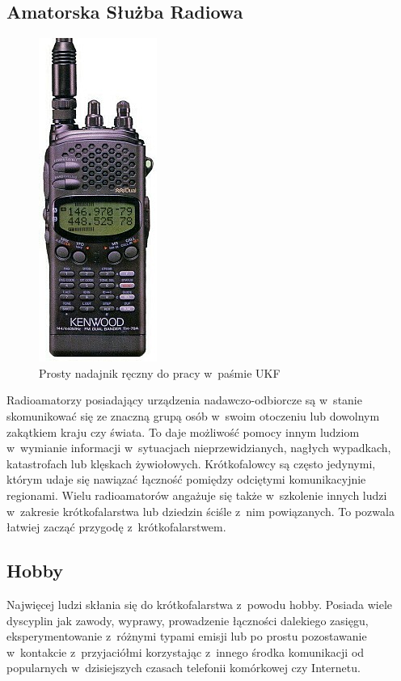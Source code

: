 \documentclass[eng,oneside]{mgr}
\begin{document}
			\subsection{Amatorska Służba Radiowa}
			\begin{figure}
				\vspace{-20pt}
				\begin{center}
					\includegraphics[scale=0.5]{ukf_handheld}
				\end{center}
				\vspace{-20pt}
				\caption{Prosty nadajnik ręczny do pracy w~paśmie UKF}
				\vspace{-40pt}
				\label{fig:ukf_handheld}
			\end{figure}
			Radioamatorzy posiadający urządzenia nadawczo-odbiorcze są w~stanie skomunikować się ze znaczną grupą osób w~swoim otoczeniu lub dowolnym zakątkiem kraju czy świata. To daje możliwość pomocy innym ludziom w~wymianie informacji w~sytuacjach nieprzewidzianych, nagłych wypadkach, katastrofach lub klęskach żywiołowych. Krótkofalowcy są często jedynymi, którym udaje się nawiązać łączność pomiędzy odciętymi komunikacyjnie regionami. Wielu radioamatorów angażuje się także w~szkolenie innych ludzi w~zakresie krótkofalarstwa lub dziedzin ściśle z~nim powiązanych. To pozwala łatwiej zacząć przygodę z~krótkofalarstwem.

			\subsection{Hobby}
			Najwięcej ludzi skłania się do krótkofalarstwa z~powodu hobby. Posiada wiele dyscyplin jak zawody, wyprawy, prowadzenie łączności dalekiego zasięgu, eksperymentowanie z~różnymi typami emisji lub po prostu pozostawanie w~kontakcie z~przyjaciółmi korzystając z~innego środka komunikacji od popularnych w~dzisiejszych czasach telefonii komórkowej czy Internetu.
\end{document}
